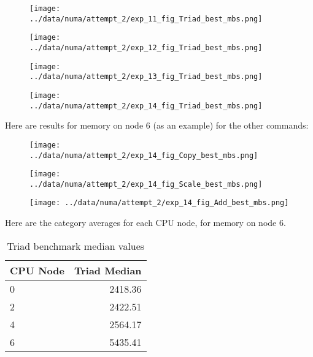 \documentclass[a4paper, 12pt]{article}
\begin{document}
\begin{figure}[H]
    \centering
        \texttt{[image: ../data/numa/attempt\_2/exp\_11\_fig\_Triad\_best\_mbs.png]}
\end{figure}

\begin{figure}[H]
    \centering
        \texttt{[image: ../data/numa/attempt\_2/exp\_12\_fig\_Triad\_best\_mbs.png]}
\end{figure}

\begin{figure}[H]
    \centering
        \texttt{[image: ../data/numa/attempt\_2/exp\_13\_fig\_Triad\_best\_mbs.png]}
\end{figure}

\begin{figure}[H]
    \centering
        \texttt{[image: ../data/numa/attempt\_2/exp\_14\_fig\_Triad\_best\_mbs.png]}
\end{figure}

Here are results for memory on node 6 (as an example) for the other commands:

\begin{figure}[H]
    \centering
        \texttt{[image: ../data/numa/attempt\_2/exp\_14\_fig\_Copy\_best\_mbs.png]}
\end{figure}

\begin{figure}[H]
    \centering
        \texttt{[image: ../data/numa/attempt\_2/exp\_14\_fig\_Scale\_best\_mbs.png]}
\end{figure}

\begin{figure}[H]
    \centering
        \texttt{[image: ../data/numa/attempt\_2/exp\_14\_fig\_Add\_best\_mbs.png]}
\end{figure}

Here are the category averages for each CPU node, for memory on node 6.

\begin{table}[H]
\begin{center}
\begin{tabular}{| l | r |}
\hline
CPU Node & Triad Median \\
\hline
0 & 2418.36 \\
\hline
2 & 2422.51 \\
\hline
4 & 2564.17 \\
\hline
6 & 5435.41 \\
\hline
\end{tabular}
\end{center}

\caption{Triad benchmark median values}
\label{node2:triad:table}
\end{table}
\end{document}
